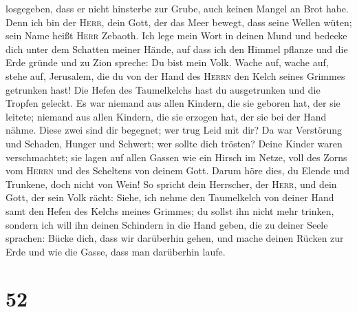 losgegeben, dass er nicht hinsterbe zur Grube, auch keinen Mangel an
Brot habe.  Denn ich bin der \textsc{Herr}, dein Gott,
der das Meer bewegt, dass seine Wellen wüten; sein Name heißt
\textsc{Herr} Zebaoth.  Ich lege mein Wort in deinen Mund
und bedecke dich unter dem Schatten meiner Hände, auf dass ich den
Himmel pflanze und die Erde gründe und zu Zion spreche: Du bist mein
Volk.  Wache auf, wache auf, stehe auf, Jerusalem, die du
von der Hand des \textsc{Herrn} den Kelch seines Grimmes getrunken hast!
Die Hefen des Taumelkelchs hast du ausgetrunken und die Tropfen geleckt.
 Es war niemand aus allen Kindern, die sie geboren hat,
der sie leitete; niemand aus allen Kindern, die sie erzogen hat, der sie
bei der Hand nähme.  Diese zwei sind dir begegnet; wer
trug Leid mit dir? Da war Verstörung und Schaden, Hunger und Schwert;
wer sollte dich trösten?  Deine Kinder waren
verschmachtet; sie lagen auf allen Gassen wie ein Hirsch im Netze, voll
des Zorns vom \textsc{Herrn} und des Scheltens von deinem Gott.
 Darum höre dies, du Elende und Trunkene, doch nicht von
Wein!  So spricht dein Herrscher, der \textsc{Herr}, und
dein Gott, der sein Volk rächt: Siehe, ich nehme den Taumelkelch von
deiner Hand samt den Hefen des Kelchs meines Grimmes; du sollst ihn
nicht mehr trinken,  sondern ich will ihn deinen
Schindern in die Hand geben, die zu deiner Seele sprachen: Bücke dich,
dass wir darüberhin gehen, und mache deinen Rücken zur Erde und wie die
Gasse, dass man darüberhin laufe.

\hypertarget{section-51}{%
\section{52}\label{section-51}}

